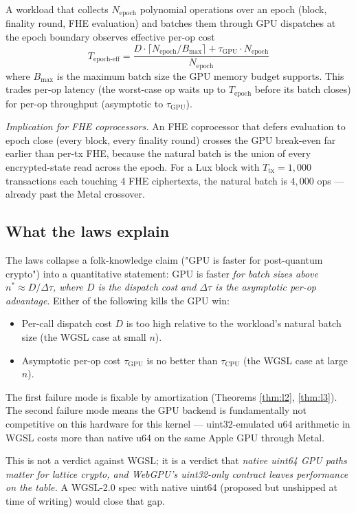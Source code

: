 \begin{theorem}
\label{thm:l3}
A workload that collects $N_\text{epoch}$ polynomial operations over
an epoch (block, finality round, FHE evaluation) and batches them
through GPU dispatches at the epoch boundary observes effective
per-op cost
\[
T_\text{epoch-eff}
= \frac{D \cdot \lceil N_\text{epoch} / B_\text{max} \rceil + \tau_\text{GPU} \cdot N_\text{epoch}}{N_\text{epoch}}
\]
where $B_\text{max}$ is the maximum batch size the GPU memory
budget supports. This trades per-op latency (the worst-case op
waits up to $T_\text{epoch}$ before its batch closes) for per-op
throughput (asymptotic to $\tau_\text{GPU}$).
\end{theorem}

\textit{Implication for FHE coprocessors.} An FHE coprocessor that
defers evaluation to epoch close (every block, every finality
round) crosses the GPU break-even far earlier than per-tx FHE,
because the natural batch is the union of every encrypted-state
read across the epoch. For a Lux block with $T_\text{tx} = 1{,}000$
transactions each touching $4$ FHE ciphertexts, the natural batch
is $4{,}000$ ops — already past the Metal crossover.

\subsection{What the laws explain}

The laws collapse a folk-knowledge claim ("GPU is faster for
post-quantum crypto") into a quantitative statement: GPU is faster
\emph{for batch sizes above $n^* \approx D / \Delta\tau$, where $D$
is the dispatch cost and $\Delta\tau$ is the asymptotic per-op
advantage}. Either of the following kills the GPU win:
\begin{itemize}[nosep]
\item Per-call dispatch cost $D$ is too high relative to the
workload's natural batch size (the WGSL case at small $n$).
\item Asymptotic per-op cost $\tau_\text{GPU}$ is no better than
$\tau_\text{CPU}$ (the WGSL case at large $n$).
\end{itemize}

The first failure mode is fixable by amortization (Theorems
\ref{thm:l2}, \ref{thm:l3}). The second failure mode means the GPU
backend is fundamentally not competitive on this hardware for this
kernel — uint32-emulated u64 arithmetic in WGSL costs more than
native u64 on the same Apple GPU through Metal.

This is not a verdict against WGSL; it is a verdict that
\emph{native uint64 GPU paths matter for lattice crypto, and
WebGPU's uint32-only contract leaves performance on the table.} A
WGSL-2.0 spec with native uint64 (proposed but unshipped at time
of writing) would close that gap.
